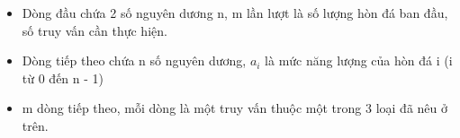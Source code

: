 \begin{itemize}
	\item     Dòng đầu chứa 2 số nguyên dương n, m lần lượt là số lượng hòn đá ban đầu, số truy vấn cần thực hiện.   
	\item     Dòng tiếp theo chứa n số nguyên dương, $a_{i}$    là mức năng lượng của hòn đá i (i từ 0 đến n - 1)   
	\item     m dòng tiếp theo, mỗi dòng là một truy vấn thuộc một trong 3 loại đã nêu ở trên.   
\end{itemize}